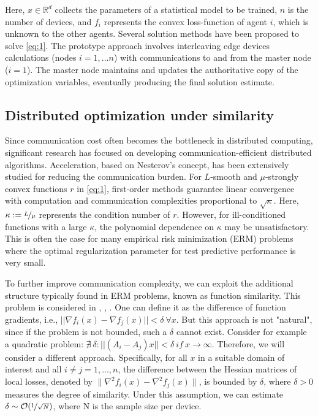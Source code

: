 \documentclass{article}
\begin{document}
Here, $x\in\mathbb{R}^d$ collects the parameters of a statistical model to be trained, $n$ is the number of devices, and $f_i$ represents the convex loss-function of agent $i$, which is unknown to the other agents. Several solution methods have been proposed to solve \eqref{eq:1}. The prototype approach involves interleaving edge devices calculations (nodes $i = 1, \ldots n$) with communications to and from the master node ($i = 1$). The master node maintains and updates the authoritative copy of the optimization variables, eventually producing the final solution estimate.

\subsection{Distributed optimization under similarity}

Since communication cost often becomes the bottleneck in distributed computing, significant research has focused on developing communication-efficient distributed algorithms. Acceleration, based on Nesterov's concept, has been extensively studied for reducing the communication burden. For $L$-smooth and $\mu$-strongly convex functions $r$ in \eqref{eq:1}, first-order methods guarantee linear convergence with computation and communication complexities proportional to $\sqrt{\kappa}$. Here, $\kappa := \nicefrac{L}{\mu}$ represents the condition number of $r$. However, for ill-conditioned functions with a large $\kappa$, the polynomial dependence on $\kappa$ may be unsatisfactory. This is often the case for many empirical risk minimization (ERM) problems where the optimal regularization parameter for test predictive performance is very small.

To further improve communication complexity, we can exploit the additional structure typically found in ERM problems, known as function similarity. This problem is considered in \cite{arjevani2015communication}, \cite{shamir2014communication}, \cite{matsushima2014distributed}. One can define it as the difference of function gradients, i.e., $||\nabla f_i (x) - \nabla f_j (x)|| < \delta ~ \forall x$. But this approach is not "natural", since if the problem is not bounded, such a $\delta$ cannot exist. Consider for example a quadratic problem: $\nexists~ \delta: ||(A_i - A_j)x|| < \delta~ if~ x\rightarrow \infty$. Therefore, we will consider a different approach. Specifically, for all $x$ in a suitable domain of interest and all $i \neq j = 1,\ldots,n$, the difference between the Hessian matrices of local losses, denoted by $\|\nabla ^2 f_i(x) - \nabla ^2 f_j(x)\|$, is bounded by $\delta$, where $\delta > 0$ measures the degree of similarity. Under this assumption, we can estimate $\delta \sim \mathcal O(\nicefrac{1}{\sqrt{N}})$, where N is the sample size per device. 
\end{document}
